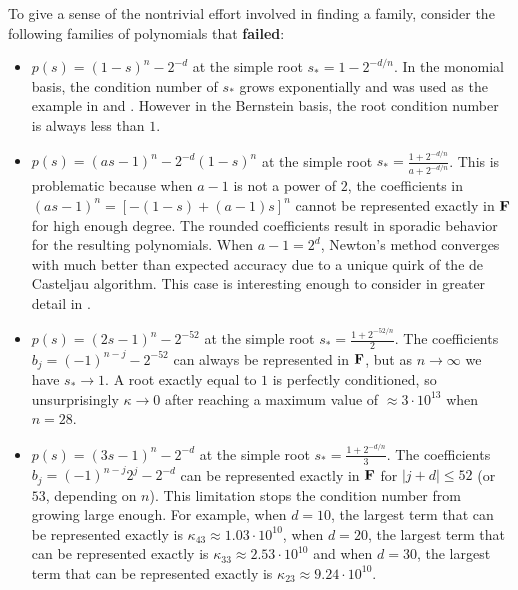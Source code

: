 To give a sense of the nontrivial effort involved in finding a
family, consider the following families of polynomials that
\textbf{failed}:
\begin{itemize}
  \itemsep 0em
  \item \(p(s) = (1 - s)^n - 2^{-d}\) at the simple root
    \(s_{\ast} = 1 - 2^{-d/n}\). In the monomial basis, the
    condition number of \(s_{\ast}\) grows exponentially and was used
    as the example in \cite{Graillat2008} and \cite[Section~8]{Jiang2013}.
    However in the Bernstein basis, the root condition
    number is always less than \(1\).
  \item \(p(s) = (as - 1)^n - 2^{-d} (1 - s)^n\) at the simple root
    \(s_{\ast} = \frac{1 + 2^{-d/n}}{a + 2^{-d/n}}\). This is problematic
    because when \(a - 1\) is not a power of \(2\), the coefficients
    in \((as - 1)^n = \left[-(1 - s) + (a - 1)s\right]^n\) cannot be
    represented exactly in \(\mathbf{F}\) for high enough degree. The rounded
    coefficients result in sporadic behavior for the resulting polynomials.
    When \(a - 1 = 2^d\), Newton's method converges with much better than
    expected accuracy due to a unique quirk of the de Casteljau algorithm.
    This case is interesting enough to consider in greater detail
    in \cite{Hermes2018}.
  \item \(p(s) = (2s - 1)^n - 2^{-52}\) at the simple root
    \(s_{\ast} = \frac{1 + 2^{-52/n}}{2}\). The coefficients \(b_j =
    (-1)^{n - j} - 2^{-52}\) can always be represented in \(\mathbf{F}\),
    but as \(n \to \infty\) we have \(s_{\ast} \to 1\).
    A root exactly equal to \(1\) is perfectly conditioned, so
    unsurprisingly \(\kappa \to 0\) after reaching a maximum
    value of \(\approx 3 \cdot 10^{13}\) when \(n = 28\).
  \item \(p(s) = (3s - 1)^n - 2^{-d}\) at the simple root \(s_{\ast} = \frac{
    1 + 2^{-d/n}}{3}\). The coefficients \(b_j = (-1)^{n - j} 2^j - 2^{-d}\)
    can be represented exactly in \(\mathbf{F}\) for \(\left|j + d\right|
    \leq 52\) (or \(53\), depending on \(n\)). This limitation stops the
    condition number from growing large enough. For example, when \(d = 10\),
    the largest term that can be represented exactly is \(\kappa_{43}
    \approx 1.03 \cdot 10^{10}\),
    when \(d = 20\), the largest term that
    can be represented exactly is \(\kappa_{33} \approx 2.53 \cdot 10^{10}\)
    and when \(d = 30\), the largest term that
    can be represented exactly is \(\kappa_{23} \approx 9.24 \cdot 10^{10}\).
\end{itemize}

